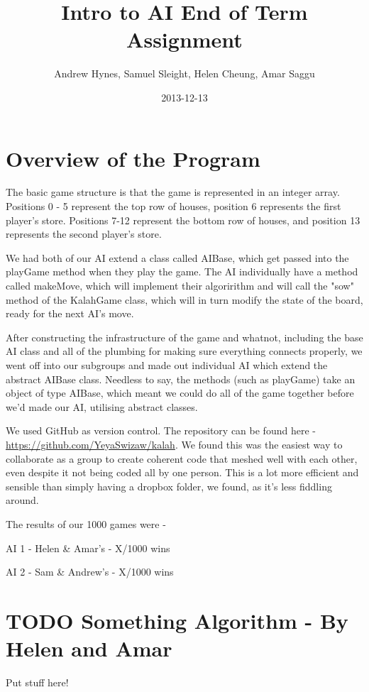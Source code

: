 \documentclass[11pt]{article}
\author{Andrew Hynes, Samuel Sleight, Helen Cheung, Amar Saggu}
\date{2013-12-13}
\title{Intro to AI End of Term Assignment}
\begin{document}
\maketitle
\tableofcontents


\section{Overview of the Program}
\label{sec-1}

The basic game structure is that the game is represented in an integer array. Positions 0 - 5 represent the top row of houses, position 6 represents the first player's store. Positions 7-12 represent the bottom row of houses, and position 13 represents the second player's store.

We had both of our AI extend a class called AIBase, which get passed into the playGame method when they play the game. The AI individually have a method called makeMove, which will implement their algoririthm and will call the "sow" method of the KalahGame class, which will in turn modify the state of the board, ready for the next AI's move.

After constructing the infrastructure of the game and whatnot, including the base AI class and all of the plumbing for making sure everything connects properly, we went off into our subgroups and made out individual AI which extend the abstract AIBase class. Needless to say, the methods (such as playGame) take an object of type AIBase, which meant we could do all of the game together before we'd made our AI, utilising abstract classes.

We used GitHub as version control. The repository can be found here - \url{https://github.com/YeyaSwizaw/kalah}. We found this was the easiest way to collaborate as a group to create coherent code that meshed well with each other, even despite it not being coded all by one person. This is a lot more efficient and sensible than simply having a dropbox folder, we found, as it's less fiddling around.

The results of our 1000 games were -

AI 1 - Helen \& Amar's - X/1000 wins

AI 2 - Sam \& Andrew's - X/1000 wins
\section{{\bfseries\sffamily TODO} Something Algorithm - By Helen and Amar}
\label{sec-2}

Put stuff here!
\end{document}
